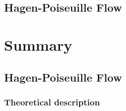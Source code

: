 \subsection{Hagen-Poiseuille Flow}
\section{Summary}

\clearpage
\clearpage

\subsection{Hagen-Poiseuille Flow}

\subsubsection{Theoretical description}

